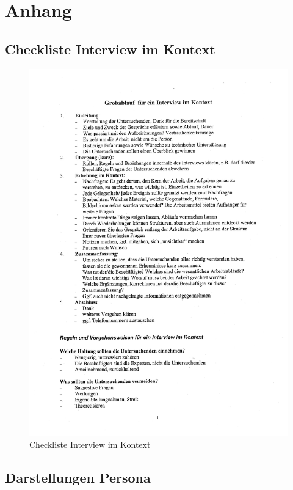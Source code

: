\chapter{Anhang}\label{ch:appendix}

\section{Checkliste Interview im Kontext}\label{ap:checkliste}

\begin{figure}[htp]
    \centering
    \includegraphics[width=.8\textwidth]{images/InterviewIK-Checkliste.pdf}
    \caption{Checkliste Interview im Kontext \cite{NOG}}
    \label{fig:IIK-Checkliste}
\end{figure}

\section{Darstellungen Persona}\label{ap:personas}

